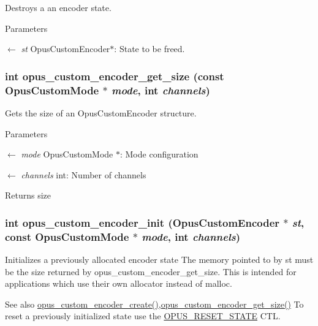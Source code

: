 Destroys a an encoder state. 
\begin{DoxyParams}{Parameters}
\item[\mbox{$\leftarrow$} {\em st}]{\ttfamily OpusCustomEncoder$\ast$}: State to be freed. \end{DoxyParams}
\hypertarget{group__opus__custom_ga42f50e7f2942144c18c321f00f358ba0}{
\subsubsection[{opus\_\-custom\_\-encoder\_\-get\_\-size}]{\setlength{\rightskip}{0pt plus 5cm}int opus\_\-custom\_\-encoder\_\-get\_\-size (const {\bf OpusCustomMode} $\ast$ {\em mode}, \/  int {\em channels})}}
\label{group__opus__custom_ga42f50e7f2942144c18c321f00f358ba0}


Gets the size of an OpusCustomEncoder structure. 
\begin{DoxyParams}{Parameters}
\item[\mbox{$\leftarrow$} {\em mode}]{\ttfamily OpusCustomMode $\ast$}: Mode configuration \item[\mbox{$\leftarrow$} {\em channels}]{\ttfamily int}: Number of channels \end{DoxyParams}
\begin{DoxyReturn}{Returns}
size 
\end{DoxyReturn}
\hypertarget{group__opus__custom_gacd63f7f4f4b198d941d46ceb9fccfea2}{
\subsubsection[{opus\_\-custom\_\-encoder\_\-init}]{\setlength{\rightskip}{0pt plus 5cm}int opus\_\-custom\_\-encoder\_\-init ({\bf OpusCustomEncoder} $\ast$ {\em st}, \/  const {\bf OpusCustomMode} $\ast$ {\em mode}, \/  int {\em channels})}}
\label{group__opus__custom_gacd63f7f4f4b198d941d46ceb9fccfea2}


Initializes a previously allocated encoder state The memory pointed to by st must be the size returned by opus\_\-custom\_\-encoder\_\-get\_\-size. This is intended for applications which use their own allocator instead of malloc. \begin{DoxySeeAlso}{See also}
\hyperlink{group__opus__custom_ga5aa778f7b0d93b397c1c0fb04b59eb02}{opus\_\-custom\_\-encoder\_\-create()},\hyperlink{group__opus__custom_ga42f50e7f2942144c18c321f00f358ba0}{opus\_\-custom\_\-encoder\_\-get\_\-size()} To reset a previously initialized state use the \hyperlink{group__opus__genericctls_gadc74e4fa8bcdf9994187d52d92207337}{OPUS\_\-RESET\_\-STATE} CTL. 
\end{DoxySeeAlso}

